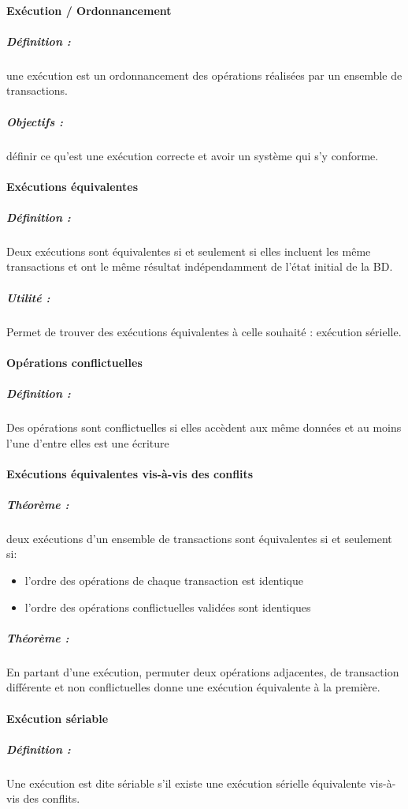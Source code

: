 \documentclass[10pt,a4paper,twoside]{article}
\begin{document}
\paragraph{Exécution / Ordonnancement}
\subparagraph{Définition :} une exécution est un ordonnancement des opérations réalisées par un ensemble de transactions.

\subparagraph{Objectifs :} définir ce qu'est une exécution correcte et avoir un système qui s'y conforme.

\paragraph{Exécutions équivalentes}
\subparagraph{Définition :} Deux exécutions sont équivalentes si et seulement si elles incluent les même transactions et ont le même résultat indépendamment de l'état initial de la BD.

\subparagraph{Utilité : } Permet de trouver des exécutions équivalentes à celle souhaité : exécution sérielle.

\paragraph{Opérations conflictuelles}
\subparagraph{Définition :} Des opérations sont conflictuelles si elles accèdent aux même données et au moins l'une d'entre elles est une écriture

\paragraph{Exécutions équivalentes vis-à-vis des conflits}
\subparagraph{Théorème :} deux exécutions d'un ensemble de transactions sont équivalentes si et seulement si:
\begin{itemize}
\item l'ordre des opérations de chaque transaction est identique
\item l'ordre des opérations conflictuelles validées sont identiques
\end{itemize}

\subparagraph{Théorème :} En partant d'une exécution, permuter deux opérations adjacentes, de transaction différente et non conflictuelles donne une exécution équivalente à la première.

\paragraph{Exécution sériable}
\subparagraph{Définition :} Une exécution est dite sériable s'il existe une exécution sérielle équivalente vis-à-vis des conflits.
\end{document}
